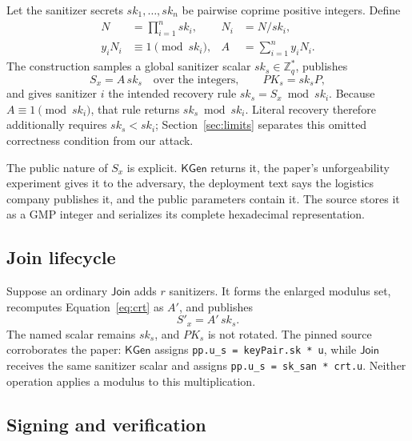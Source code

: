 \documentclass[10pt,a4paper]{article}
\newcommand{\Zq}{\mathbb{Z}_q}
\newcommand{\KeyGen}{\mathsf{KGen}}
\newcommand{\DJoin}{\mathsf{Join}}
\begin{document}
Let the sanitizer secrets \(sk_1,\ldots,sk_n\) be pairwise coprime positive
integers. Define
\begin{align}
  N   &= \prod_{i=1}^{n} sk_i, &
  N_i &= N/sk_i, \\
  y_iN_i &\equiv 1 \pmod{sk_i}, &
  A   &= \sum_{i=1}^{n} y_iN_i.                 \label{eq:crt}
\end{align}
The construction samples a global sanitizer scalar \(sk_s\in\Zq^*\), publishes
\begin{equation}
  S_x=A\,sk_s\quad\text{over the integers},
  \qquad PK_s=sk_sP,                              \label{eq:mask}
\end{equation}
and gives sanitizer \(i\) the intended recovery rule
\(sk_s=S_x\bmod sk_i\). Because \(A\equiv1\pmod{sk_i}\), that rule returns
\(sk_s\bmod sk_i\). Literal recovery therefore additionally requires
\(sk_s<sk_i\); Section~\ref{sec:limits} separates this omitted correctness
condition from our attack.

The public nature of \(S_x\) is explicit. \(\KeyGen\) returns it, the paper's
unforgeability experiment gives it to the adversary, the deployment text says
the logistics company publishes it, and the public parameters contain it. The
source stores it as a GMP integer and serializes its complete hexadecimal
representation.

\subsection{Join lifecycle}

Suppose an ordinary \(\DJoin\) adds \(r\) sanitizers. It forms the enlarged
modulus set, recomputes Equation~\eqref{eq:crt} as \(A'\), and publishes
\begin{equation}
  S'_x=A'\,sk_s.                                    \label{eq:joined-mask}
\end{equation}
The named scalar remains \(sk_s\), and \(PK_s\) is not rotated. The pinned
source corroborates the paper: \(\KeyGen\) assigns
\texttt{pp.u\_s = keyPair.sk * u}, while \(\DJoin\) receives the same
sanitizer scalar and assigns \texttt{pp.u\_s = sk\_san * crt.u}. Neither
operation applies a modulus to this multiplication.

\subsection{Signing and verification}
\end{document}
